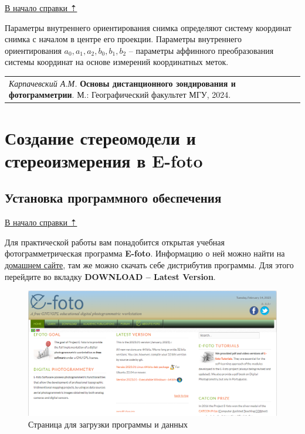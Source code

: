 \documentclass[
  12pt,
]{book}
\begin{document}
\protect\hyperlink{photogrammetry}{В начало справки ⇡}

Параметры внутреннего ориентирования снимка определяют систему координат снимка с началом в центре его проекции. Параметры внутреннего ориентирования \(a_{0}, a_{1}, a_{2}, b_{0}, b_{1}, b_{2}\) -- параметры аффинного преобразования системы координат на основе измерений координатных меток.

\begin{longtable}[]{@{}l@{}}
\toprule\noalign{}
\endhead
\bottomrule\noalign{}
\endlastfoot
\emph{Карпачевский А.М.} \textbf{Основы дистанционного зондирования и фотограмметрии}. М.: Географический факультет МГУ, 2024. \\
\end{longtable}

\hypertarget{stereo}{%
\chapter{Создание стереомодели и стереоизмерения в E-foto}\label{stereo}}

\hypertarget{stereo-soft}{%
\section{Установка программного обеспечения}\label{stereo-soft}}

\protect\hyperlink{stereo}{В начало справки ⇡}

Для практической работы вам понадобится открытая учебная фотограмметрическая программа \textbf{E-foto}. Информацию о ней можно найти на \href{http://www.efoto.eng.uerj.br/}{домашнем сайте}, там же можно скачать себе дистрибутив программы. Для этого перейдите во вкладку \textbf{DOWNLOAD -- Latest Version}.

\begin{figure}
\centering
\includegraphics{images/Ref13/Download.png}
\caption{Страница для загрузки программы и данных}
\end{figure}
\end{document}

